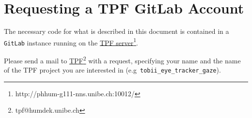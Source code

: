 \documentclass[a4paper,oneside]{book}
\begin{document}
\section{Requesting a TPF GitLab Account}
\label{sec.gitlab}
The necessary code for what is described in this document is contained in a \texttt{GitLab} instance running on the \href{http://phhum-g111-nns.unibe.ch:10012/}{TPF server}\footnote{http://phhum-g111-nns.unibe.ch:10012/}.

Please send a mail to \href{tpf@humdek.unibe.ch}{TPF}\footnote{tpf@humdek.unibe.ch} with a request, specifying your name and the name of the TPF project you are interested in (e.g~\texttt{tobii\_eye\_tracker\_gaze}).

\end{document}

